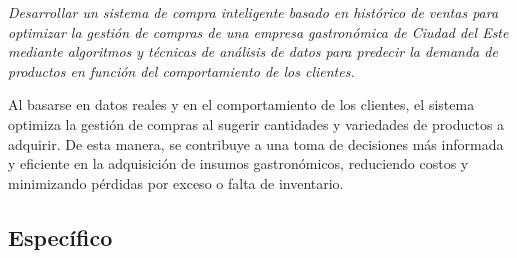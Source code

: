 \emph{Desarrollar un sistema de compra inteligente basado en histórico de ventas para optimizar la gestión de compras de una empresa gastronómica de Ciudad del Este mediante algoritmos y técnicas de análisis de datos para predecir la demanda de productos en función del comportamiento de los clientes.}

\vspace{1\baselineskip}
Al basarse en datos reales y en el comportamiento de los clientes, el sistema optimiza la gestión de compras al sugerir cantidades y variedades de productos a adquirir. De esta manera, se contribuye a una toma de decisiones más informada y eficiente en la adquisición de insumos gastronómicos, reduciendo costos y minimizando pérdidas por exceso o falta de inventario.

\subsection{Específico}

